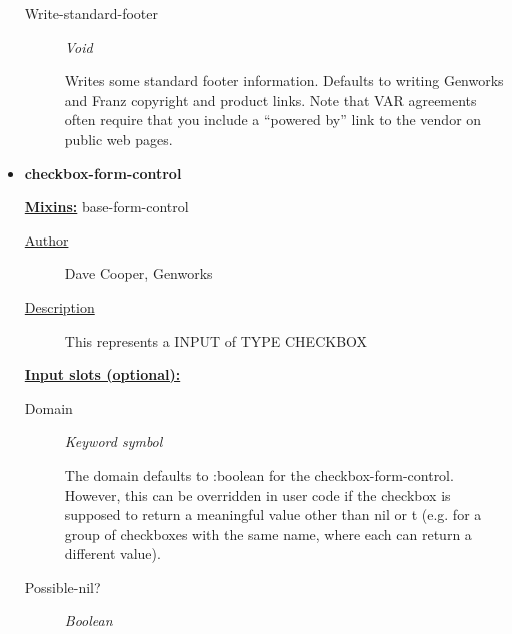 \documentclass [11pt]{book}
\begin{document}
\begin{itemize}
\begin{description}
\item [Write-standard-footer]
\emph{Void}

 Writes some standard footer information. Defaults to writing Genworks and Franz
copyright and product links. Note that VAR agreements often require that you include a ``powered by''
link to the vendor on public web pages.




\end{description}







\item {}
\label{prim:checkbox-form-control}
\textbf{checkbox-form-control}


\textbf{
\underline{Mixins:}} base-form-control





\begin{description}

\item [
\underline{Author}]


Dave Cooper, Genworks



\item [
\underline{Description}]


This represents a INPUT of TYPE CHECKBOX



\end{description}








\textbf{
\underline{Input slots (optional):}}

\begin{description}

\item [Domain]
\emph{Keyword symbol}

 The domain defaults to :boolean for the checkbox-form-control.
However, this can be overridden in user code if the checkbox is supposed to return
a meaningful value other than nil or t (e.g. for a group of checkboxes with
the same name, where each can return a different value).




\item [Possible-nil?]
\emph{Boolean}


\end{description}
\end{itemize}
\end{document}
